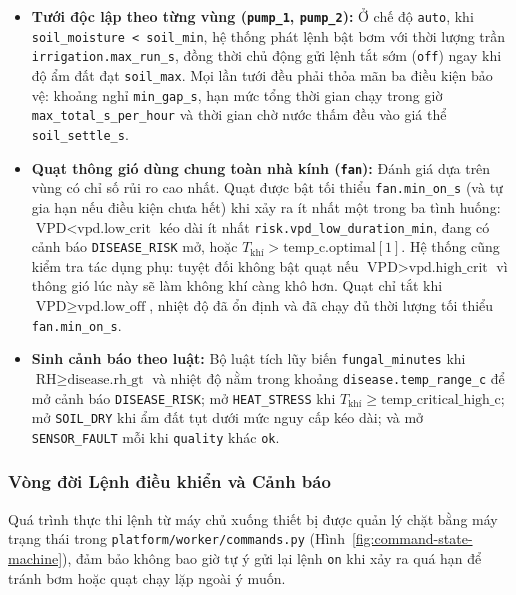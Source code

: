 \begin{itemize}[leftmargin=*]
    \item \textbf{Tưới độc lập theo từng vùng (\texttt{pump\_1}, \texttt{pump\_2}):} Ở chế độ \texttt{auto}, khi \texttt{soil\_moisture < soil\_min}, hệ thống phát lệnh bật bơm với thời lượng trần \texttt{irrigation.max\_run\_s}, đồng thời chủ động gửi lệnh tắt sớm (\texttt{off}) ngay khi độ ẩm đất đạt \texttt{soil\_max}. Mọi lần tưới đều phải thỏa mãn ba điều kiện bảo vệ: khoảng nghỉ \texttt{min\_gap\_s}, hạn mức tổng thời gian chạy trong giờ \texttt{max\_total\_s\_per\_hour} và thời gian chờ nước thấm đều vào giá thể \texttt{soil\_settle\_s}.
    \item \textbf{Quạt thông gió dùng chung toàn nhà kính (\texttt{fan}):} Đánh giá dựa trên vùng có chỉ số rủi ro cao nhất. Quạt được bật tối thiểu \texttt{fan.min\_on\_s} (và tự gia hạn nếu điều kiện chưa hết) khi xảy ra ít nhất một trong ba tình huống: \(\text{VPD} < \text{vpd.low\_crit}\) kéo dài ít nhất \texttt{risk.vpd\_low\_duration\_min}, đang có cảnh báo \texttt{DISEASE\_RISK} mở, hoặc \(T_{\text{khí}} > \text{temp\_c.optimal}[1]\). Hệ thống cũng kiểm tra tác dụng phụ: tuyệt đối không bật quạt nếu \(\text{VPD} > \text{vpd.high\_crit}\) vì thông gió lúc này sẽ làm không khí càng khô hơn. Quạt chỉ tắt khi \(\text{VPD} \ge \text{vpd.low\_off}\), nhiệt độ đã ổn định và đã chạy đủ thời lượng tối thiểu \texttt{fan.min\_on\_s}.
    \item \textbf{Sinh cảnh báo theo luật:} Bộ luật tích lũy biến \texttt{fungal\_minutes} khi \(\text{RH} \ge \text{disease.rh\_gt}\) và nhiệt độ nằm trong khoảng \texttt{disease.temp\_range\_c} để mở cảnh báo \texttt{DISEASE\_RISK}; mở \texttt{HEAT\_STRESS} khi \(T_{\text{khí}} \ge \text{temp\_critical\_high\_c}\); mở \texttt{SOIL\_DRY} khi ẩm đất tụt dưới mức nguy cấp kéo dài; và mở \texttt{SENSOR\_FAULT} mỗi khi \texttt{quality} khác \texttt{ok}.
\end{itemize}

\subsubsection{Vòng đời Lệnh điều khiển và Cảnh báo}

Quá trình thực thi lệnh từ máy chủ xuống thiết bị được quản lý chặt bằng máy trạng thái trong \texttt{platform/worker/commands.py} (Hình~\ref{fig:command-state-machine}), đảm bảo không bao giờ tự ý gửi lại lệnh \texttt{on} khi xảy ra quá hạn để tránh bơm hoặc quạt chạy lặp ngoài ý muốn.

